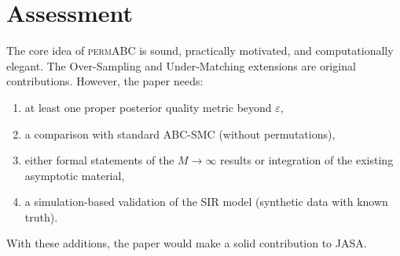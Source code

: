 \documentclass[11pt,a4paper]{article}
\begin{document}
\section*{Assessment}

The core idea of \textsc{permABC} is sound, practically motivated, and computationally elegant. The Over-Sampling and Under-Matching extensions are original contributions. However, the paper needs:
\begin{enumerate}[nosep]
    \item at least one proper posterior quality metric beyond $\varepsilon$,
    \item a comparison with standard ABC-SMC (without permutations),
    \item either formal statements of the $M \to \infty$ results or integration of the existing asymptotic material,
    \item a simulation-based validation of the SIR model (synthetic data with known truth).
\end{enumerate}

\noindent With these additions, the paper would make a solid contribution to JASA.
\end{document}
